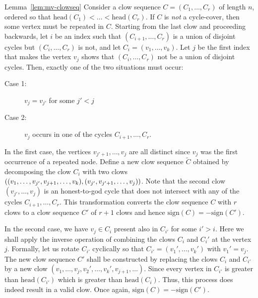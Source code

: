 \begin{proofof}{Lemma~\ref{lem:mv-clowseq}}
Consider a clow sequence $C = (C_1,\dots, C_r)$ of length $n$, ordered so that $\mathrm{head}(C_1) < \dots < \mathrm{head}(C_r)$. If $C$ is \emph{not} a cycle-cover, then some vertex must be repeated in $C$. Starting from the last clow and proceeding backwards, let $i$ be an index such that $(C_{i+1},\dots, C_{r})$ is a union of disjoint cycles but $(C_{i},\dots, C_r)$ is not, and let $C_i = (v_1,\dots, v_k)$. Let $j$ be the first index that makes the vertex $v_{j}$ shows that $(C_i,\dots, C_r)$ not be a union of disjoint cycles. Then, exactly one of the two situations must occur:
\begin{description}
 \item[Case 1:] $v_{j} = v_{j'}$ for some $j' < j$

 \item[Case 2:] $v_{j}$ occurs in one of the cycles $C_{i+1},\dots, C_r$. 
\end{description}

In the first case, the vertices $v_{j'+1},\dots, v_{j}$ are all distinct since $v_j$ was the first occurrence of a repeated node. Define a new clow sequence  $\tilde{C}$ obtained by decomposing the clow $C_i$ with two clows $\left((v_1,\dots, v_{j'},v_{j+1},\dots, v_k), (v_{j'},v_{j'+1},\dots,v_{j})\right)$. Note that the second clow $(v_{j'},\dots, v_j)$ is an honest-to-god cycle that does not intersect with any of the cycles $C_{i+1},\dots, C_r$. This transformation converts the clow sequence $C$ with $r$ clows to a clow sequence $C'$ of $r+1$ clows and hence $\mathrm{sign}(C) = - \mathrm{sign}(C')$. 

In the second case, we have $v_j \in C_i$ present also in $C_{i'}$ for some $i' > i$. Here we shall apply the inverse operation of combining the clows $C_i$ and $C_i'$ at the vertex $j$. Formally, let us rotate $C_{i'}$ cyclically so that $C_{i'} = (v_1',\dots, v_k')$ with $v_1' = v_j$. The new clow sequence $C'$ shall be constructed by replacing the clows $C_i$ and $C_{i'}$ by a new clow $(v_1,\dots, v_j, v_2',\dots, v_k', v_{j+1},\dots)$. Since every vertex in $C_{i'}$ is greater than $\mathrm{head}(C_{i'})$ which is greater than $\mathrm{head}(C_i)$. Thus, this process does indeed result in a valid clow. Once again, $\mathrm{sign}(C) = - \mathrm{sign}(C')$.\\

\end{proofof}
